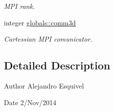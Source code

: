 \begin{DoxyCompactItemize}
\begin{DoxyCompactList}\small\item\em M\+P\+I rank. \end{DoxyCompactList}\item 
\hypertarget{namespaceglobals_a4bc8f1b5670efd802d57dce2c385b6d9}{}integer \hyperlink{namespaceglobals_a4bc8f1b5670efd802d57dce2c385b6d9}{globals\+::comm3d}\label{namespaceglobals_a4bc8f1b5670efd802d57dce2c385b6d9}

\begin{DoxyCompactList}\small\item\em Cartessian M\+P\+I comunicator. \end{DoxyCompactList}\end{DoxyCompactItemize}


\subsection{Detailed Description}
\begin{DoxyAuthor}{Author}
Alejandro Esquivel 
\end{DoxyAuthor}
\begin{DoxyDate}{Date}
2/\+Nov/2014 
\end{DoxyDate}
